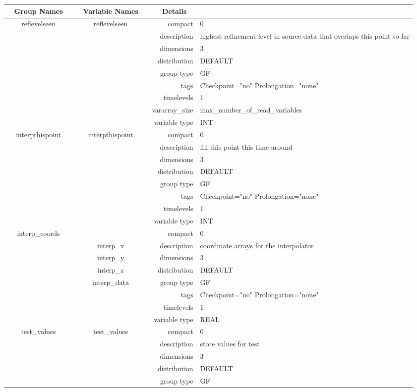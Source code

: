 \begin{tabular*}{150mm}{|c|c@{\extracolsep{\fill}}|rl|} \hline 
~ {\bf Group Names} ~ & ~ {\bf Variable Names} ~  &{\bf Details} ~ & ~\\ 
\hline 
reflevelseen & reflevelseen & compact & 0 \\ 
 &  & description & highest refinement level in source data that overlaps this point so far \\ 
 &  & dimensions & 3 \\ 
 &  & distribution & DEFAULT \\ 
 &  & group type & GF \\ 
 &  & tags & Checkpoint="no" Prolongation="none" \\ 
 &  & timelevels & 1 \\ 
 &  & vararray\_size & max\_number\_of\_read\_variables \\ 
 &  & variable type & INT \\ 
\hline 
interpthispoint & interpthispoint & compact & 0 \\ 
 &  & description & fill this point this time around \\ 
 &  & dimensions & 3 \\ 
 &  & distribution & DEFAULT \\ 
 &  & group type & GF \\ 
 &  & tags & Checkpoint="no" Prolongation="none" \\ 
 &  & timelevels & 1 \\ 
 &  & variable type & INT \\ 
\hline 
interp\_coords &  & compact & 0 \\ 
 & interp\_x & description & coordinate arrays for the interpolator \\ 
 & interp\_y & dimensions & 3 \\ 
 & interp\_z & distribution & DEFAULT \\ 
 & interp\_data & group type & GF \\ 
 &  & tags & Checkpoint="no" Prolongation="none" \\ 
 &  & timelevels & 1 \\ 
 &  & variable type & REAL \\ 
\hline 
test\_values & test\_values & compact & 0 \\ 
 &  & description & store values for test \\ 
 &  & dimensions & 3 \\ 
 &  & distribution & DEFAULT \\ 
 &  & group type & GF \\ 

\end{tabular*}
